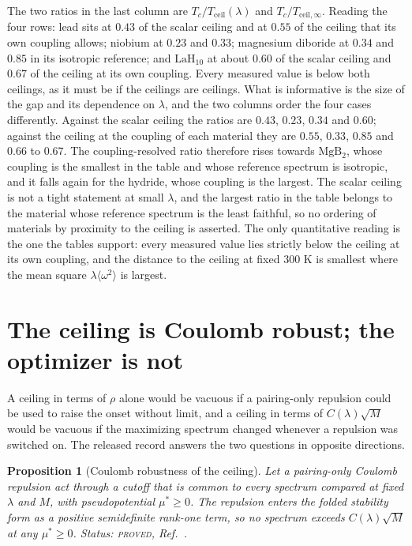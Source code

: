 \documentclass[aps,10pt,superscriptaddress,floatfix,amsmath,amssymb,nofootinbib]{revtex4-2}
\newcommand{\muS}{\mu^{*}}
\newcommand{\PROVED}{\textsc{proved}}
\newtheorem{proposition}{Proposition}
\begin{document}
The two ratios in the last column are $T_c/T_{\mathrm{ceil}}(\lambda)$ and
$T_c/T_{\mathrm{ceil},\infty}$. Reading the four rows: lead sits at $0.43$ of the scalar
ceiling and at $0.55$ of the ceiling that its own coupling allows; niobium at $0.23$ and
$0.33$; magnesium diboride at $0.34$ and $0.85$ in its isotropic reference; and
$\mathrm{LaH_{10}}$ at about $0.60$ of the scalar ceiling and $0.67$ of the ceiling at its
own coupling. Every measured value is below both ceilings, as it must be if the ceilings
are ceilings. What is informative is the size of the gap and its dependence on $\lambda$,
and the two columns order the four cases differently. Against the scalar ceiling the ratios
are $0.43$, $0.23$, $0.34$ and $0.60$; against the ceiling at the coupling of each material
they are $0.55$, $0.33$, $0.85$ and $0.66$ to $0.67$. The coupling-resolved ratio therefore
rises towards $\mathrm{MgB_2}$, whose coupling is the smallest in the table and whose
reference spectrum is isotropic, and it falls again for the hydride, whose coupling is the
largest. The scalar ceiling is not a tight statement at small $\lambda$, and the largest
ratio in the table belongs to the material whose reference spectrum is the least faithful,
so no ordering of materials by proximity to the ceiling is asserted. The only quantitative reading is the one the tables
support: every measured value lies strictly below the ceiling at its own coupling, and the
distance to the ceiling at fixed $300$ K is smallest where the mean square
$\lambda\langle\omega^{2}\rangle$ is largest.

\section{The ceiling is Coulomb robust; the optimizer is not}\label{sec:coulomb}

A ceiling in terms of $\rho$ alone would be vacuous if a pairing-only repulsion could be
used to raise the onset without limit, and a ceiling in terms of $C(\lambda)\sqrt M$ would be
vacuous if the maximizing spectrum changed whenever a repulsion was switched on. The
released record answers the two questions in opposite directions.

\begin{proposition}[Coulomb robustness of the ceiling]\label{prop:robust}
Let a pairing-only Coulomb repulsion act through a cutoff that is common to every spectrum
compared at fixed $\lambda$ and $M$, with pseudopotential $\muS\ge0$. The repulsion enters
the folded stability form as a positive semidefinite rank-one term, so no spectrum exceeds
$C(\lambda)\sqrt M$ at any $\muS\ge0$.
Status: \PROVED{}, Ref.~\cite{cutoff}.
\end{proposition}
\end{document}
